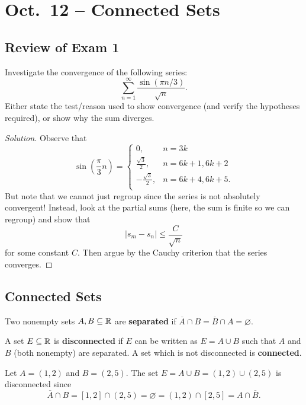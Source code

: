 \chapter{Oct.~12 -- Connected Sets}

\section{Review of Exam 1}
\begin{exercise}
  Investigate the convergence of the following series:
  \[\sum_{n=1}^\infty \frac{\sin(\pi n / 3)}{\sqrt{n}}.\]
  Either state the test/reason used to show convergence
  (and verify the hypotheses required), or show why the
  sum diverges.
\end{exercise}

\begin{proof}[Solution]
  Observe that
  \[
    \sin\left(\frac{\pi}{3}n\right) = \begin{cases}
      0, & n = 3k\\
      \frac{\sqrt{3}}{2}, & n = 6k + 1, 6k + 2 \\
      -\frac{\sqrt{3}}{2}, & n = 6k + 4, 6k + 5. \\
    \end{cases}
  \]
  But note that we cannot just regroup since the series
  is not absolutely convergent! Instead, look at the partial sums
  (here, the sum is finite so we can regroup)
  and show that
  \[
    |s_m - s_n| \le \frac{C}{\sqrt{n}}
  \]
  for some constant $C$. Then argue by the Cauchy criterion that
  the series converges.
\end{proof}

\section{Connected Sets}
\begin{definition}
  Two nonempty sets $A, B \subseteq \mathbb{R}$ are \textbf{separated}
  if $\overline{A} \cap B = \overline{B} \cap A = \varnothing$.
\end{definition}

\begin{definition}
  A set $E \subseteq \mathbb{R}$ is \textbf{disconnected} if $E$ can be
  written as $E = A \cup B$ such that $A$ and $B$ (both nonempty)
  are separated. A set which is not disconnected is
  \textbf{connected}.
\end{definition}

\begin{example}
  Let $A = (1, 2)$ and $B = (2, 5)$. The set
  $E = A \cup B = (1, 2) \cup (2, 5)$ is disconnected since
  \[\overline{A} \cap B = [1, 2] \cap (2, 5) = \varnothing = (1, 2) \cap [2, 5] = A \cap \overline{B}.\]
\end{example}

